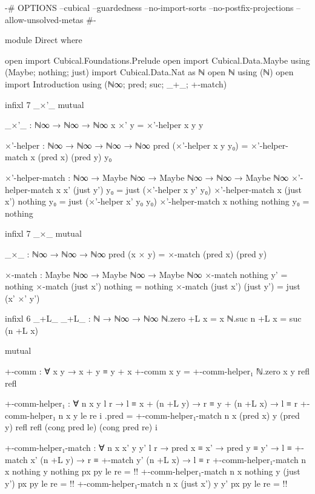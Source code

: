 \begin{code}[hide]
{-# OPTIONS --cubical --guardedness --no-import-sorts --no-postfix-projections --allow-unsolved-metas #-}

module Direct where

open import Cubical.Foundations.Prelude
open import Cubical.Data.Maybe using (Maybe; nothing; just)
import Cubical.Data.Nat as ℕ
open ℕ using (ℕ)
open import Introduction using (ℕ∞; pred; suc; _+_; +-match)
\end{code}
\begin{code}[hide]
infixl 7 _×'_
mutual
\end{code}
\begin{code}
  _×'_ : ℕ∞ → ℕ∞ → ℕ∞
  x ×' y = ×'-helper x y y

  ×'-helper : ℕ∞ → ℕ∞ → ℕ∞ → ℕ∞
  pred (×'-helper x y y₀) =
    ×'-helper-match x (pred x) (pred y) y₀

  ×'-helper-match :
    ℕ∞ → Maybe ℕ∞ → Maybe ℕ∞ → ℕ∞ →
    Maybe ℕ∞
  ×'-helper-match x x' (just y') y₀ =
    just (×'-helper x y' y₀)
  ×'-helper-match x (just x') nothing y₀ =
    just (×'-helper x' y₀ y₀)
  ×'-helper-match x nothing nothing y₀ =
    nothing
\end{code}

\begin{code}[hide]
infixl 7 _×_
mutual
\end{code}
\begin{code}
  _×_ : ℕ∞ → ℕ∞ → ℕ∞
  pred (x × y) = ×-match (pred x) (pred y)

  ×-match : Maybe ℕ∞ → Maybe ℕ∞ → Maybe ℕ∞
  ×-match nothing    y'         = nothing
  ×-match (just x')  nothing    = nothing
  ×-match (just x')  (just y')  = just (x' ×' y')
\end{code}

\begin{code}
infixl 6 _+L_
_+L_ : ℕ → ℕ∞ → ℕ∞
ℕ.zero +L x = x
ℕ.suc n +L x = suc (n +L x)
\end{code}

\begin{code}[hide]
mutual
\end{code}
\begin{code}
  +-comm : ∀ x y → x + y ≡ y + x
  +-comm x y = +-comm-helper₁ ℕ.zero x y refl refl

  +-comm-helper₁ :
    ∀ n x y {l r} → l ≡ x + (n +L y) → r ≡ y + (n +L x) → l ≡ r
  +-comm-helper₁ n x y le re i .pred =
    +-comm-helper₁-match n x (pred x) y (pred y)
      refl refl (cong pred le) (cong pred re) i

  +-comm-helper₁-match :
    ∀ n x x' y y' {l r} →
    pred x ≡ x' → pred y ≡ y' →
    l ≡ +-match x' (n +L y) → r ≡ +-match y' (n +L x) →
    l ≡ r
  +-comm-helper₁-match n x nothing y nothing px py le re = {!!}
  +-comm-helper₁-match n x nothing y (just y') px py le re = {!!}
  +-comm-helper₁-match n x (just x') y y' px py le re = {!!}
\end{code}

